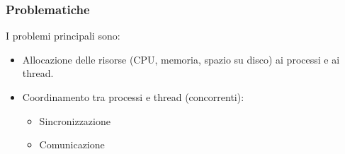 \documentclass[a4paper]{article}
\begin{document}
\subsubsection{Problematiche}
I problemi principali sono:
\begin{itemize}
  \item Allocazione delle risorse (CPU, memoria, spazio su disco) ai
    processi e ai thread.
  \item Coordinamento tra processi e thread (concorrenti):
    \begin{itemize}
      \item Sincronizzazione
      \item Comunicazione
    \end{itemize}
\end{itemize}


%
%
%
%
%
%
\end{document}

